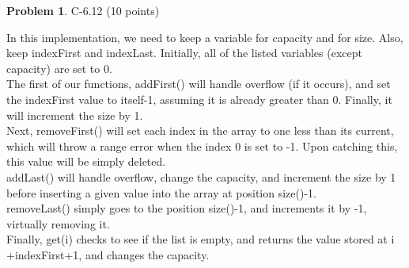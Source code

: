 \documentclass[12pt]{report}
\theoremstyle{definition}
\newtheorem{problem}{Problem}
\begin{document}
\begin{problem}			C-6.12 (10 points)
\end{problem}
					In this implementation, we need to keep a variable for capacity and for size. Also, keep 					indexFirst and indexLast. Initially, all of the listed variables (except capacity) are set to 					0. \\
					The first of our functions, addFirst() will handle overflow (if it occurs), and set the 						indexFirst value to itself-1, assuming it is already greater than 0. Finally, it will increment 					the size by 1. \\
					Next, removeFirst() will set each index in the array to one less than its current, which 					will throw a range error when the index 0 is set to -1. Upon catching this, this value will 					be simply deleted. \\
					addLast() will handle overflow, change the capacity, and increment the size by 1 before 					inserting a given value into the array at position size()-1. \\
					removeLast() simply goes to the position size()-1, and increments it by -1, virtually 						removing it. \\
					Finally, get(i) checks to see if the list is empty, and returns the value stored at i							+indexFirst+1, and changes the capacity. 
					
\goodbreak
\end{document}
